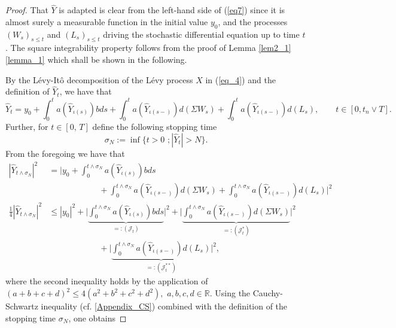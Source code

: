 \begin{proof}
That $\hat{Y}$ is adapted is clear from the left-hand side of (\ref{eq7}) since it is almost surely a measurable function in the initial value $y_0$, and the processes $(W_s)_{s \leq t}$ and $(L_s)_{s \leq t}$ driving the stochastic differential equation up to time $t$. The square integrability property follows from the proof of Lemma \ref{lem2_1}\ref{lemma_1} which shall be shown in the following.

By the L\'evy-It\^o decomposition of the L\'evy process $X$ in (\ref{eq_4}) and the definition of $\hat{Y}_{t}$, we have that
\begin{equation*}
\hat{Y}_{t} = y_0 + \int^t_{0} a(\hat{Y}_{\iota(s)}) b ds + \int^t_{0} a(\hat{Y}_{\iota(s-)})d(\Sigma W_s) + \int^t_{0} a(\hat{Y}_{\iota(s-)})d(L_s), \qquad t \in [0, t_n \lor T].
\end{equation*}
Further, for $t \in [0, \, T]$ define the following stopping time
\begin{equation*}
    \sigma_N := \inf \{t > 0 \,\, ; |\hat{Y}_{t}| > N \}.
\end{equation*}
From the foregoing we have that
\begin{equation}\label{eq11}
    \begin{aligned}
        |\hat{Y}_{t  \land \sigma_N}|^2 &=  \bigg| y_0 + \int^{t \land \sigma_N}_{0} a(\hat{Y}_{\iota(s)}) bds \\
            &\qquad\qquad\qquad+ \int^{t \land \sigma_N}_{0} a(\hat{Y}_{\iota(s-)})d(\Sigma W_s) + \int^{t \land \sigma_N}_{0} a(\hat{Y}_{\iota(s-)})d(L_s) \bigg|^2 \\
            \frac{1}{4} |\hat{Y}_{t  \land \sigma_N}|^2 &\leq  |y_0|^2 + \bigg|\underbrace{\int^{t \land \sigma_N}_{0} a(\hat{Y}_{\iota(s)})bds}_{=:(\mathcal{J}_t)}\bigg|^2 + \bigg|\underbrace{\int^{t \land \sigma_N}_{0}a(\hat{Y}_{\iota(s-)})d(\Sigma W_s)}_{=:(\mathcal{J}^{*}_t)} \bigg|^2 \\
            &\qquad\qquad\qquad+ \bigg|\underbrace{\int^{t \land \sigma_N}_{0}a(\hat{Y}_{\iota(s-)})d(L_s)}_{=:(\mathcal{J}^{**}_t)} \bigg|^2,
     \end{aligned}
\end{equation}
where the second inequality holds by the application of \break $(a + b + c+d)^2 \leq 4(a^2+b^2+c^2+d^2), \, \, a,b,c,d \in \mathbb{R} $. Using the Cauchy-Schwartz inequality (cf. \eqref{Appendix_CS}) combined with the definition of the stopping time $\sigma_N$, one obtains %

\end{proof}

